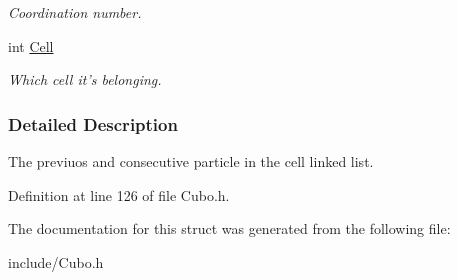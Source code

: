 \begin{DoxyCompactItemize}
\begin{DoxyCompactList}\small\item\em \-Coordination number. \end{DoxyCompactList}\item 
\hypertarget{structDOMAIN__PART_ab77aad3f51cc44ef2c0649e543c19c9d}{int \hyperlink{structDOMAIN__PART_ab77aad3f51cc44ef2c0649e543c19c9d}{\-Cell}}\label{structDOMAIN__PART_ab77aad3f51cc44ef2c0649e543c19c9d}

\begin{DoxyCompactList}\small\item\em \-Which cell it's belonging. \end{DoxyCompactList}\end{DoxyCompactItemize}


\subsubsection{\-Detailed \-Description}
\-The previuos and consecutive particle in the cell linked list. 

\-Definition at line 126 of file \-Cubo.\-h.



\-The documentation for this struct was generated from the following file\-:\begin{DoxyCompactItemize}
\item 
include/\-Cubo.\-h\end{DoxyCompactItemize}
